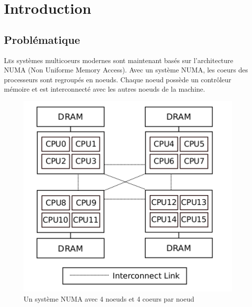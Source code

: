 \chapter{Introduction}
  \section{Problématique}
    \lettrine[nindent=0em,lines=3]{L} es systèmes multicoeurs modernes sont
    maintenant basés sur l'architecture NUMA (Non Uniforme Memory Access). Avec
    un système NUMA, les coeurs des processeurs sont regroupés en noeuds. Chaque
    noeud possède un contrôleur mémoire et est interconnecté avec les autres
    noeuds de la machine.
    
    \begin{figure}[H]
      \centering
      \includegraphics[scale=0.35]{img/numa_arch.png}
      \caption{Un système NUMA avec 4 noeuds et 4 coeurs par noeud}
      \label{f:numa_arch}
    \end{figure}
    
